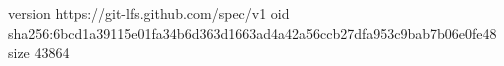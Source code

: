 version https://git-lfs.github.com/spec/v1
oid sha256:6bcd1a39115e01fa34b6d363d1663ad4a42a56ccb27dfa953c9bab7b06e0fe48
size 43864
